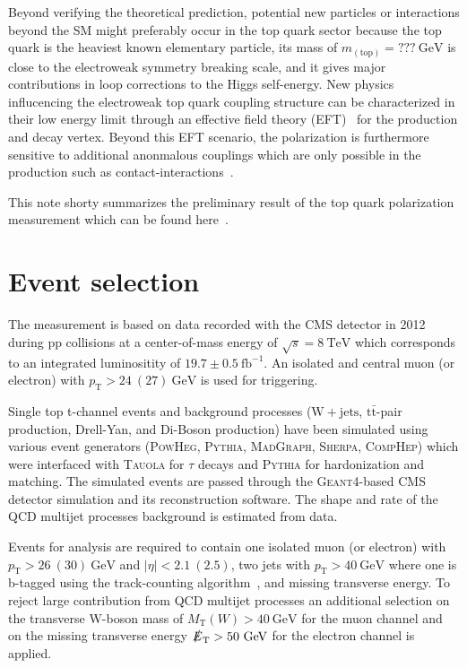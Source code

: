 \documentclass[a4paper]{jpconf}
\newcommand{\unit}[1]{\ensuremath{\mathrm{~#1}}}
\newcommand{\wjets}[0]{\mathrm{W+jets}}
\newcommand{\ttbar}[0]{\ensuremath{\mathrm{t\bar{t}}}}
\newcommand{\pT}[0]{\ensuremath{p_\mathrm{T}}}
\newcommand{\mtw}[0]{\ensuremath{M_\mathrm{T}(W)}}
\newcommand{\met}[0]{\ensuremath{\slashed E_\mathrm{T}}}
\begin{document}
Beyond verifying the theoretical prediction, potential new particles or interactions beyond the SM might preferably occur in the top quark sector because the top quark is the heaviest known elementary particle, its mass of $m_{\mathrm{(top)}}=???\unit{GeV}$ is close to the electroweak symmetry breaking scale, and it gives major contributions in loop corrections to the Higgs self-energy. New physics influcencing the electroweak top quark coupling structure can be characterized in their low energy limit through an effective field theory (EFT)~\cite{jaaswpol} for the production and decay vertex. Beyond this EFT scenario, the polarization is furthermore sensitive to additional anonmalous couplings which are only possible in the production such as contact-interactions~\cite{fabian}.


This note shorty summarizes the preliminary result of the top quark polarization measurement which can be found here~\cite{stpol}.


\section{Event selection}
The measurement is based on data recorded with the CMS detector in 2012 during pp collisions at a center-of-mass energy of $\sqrt{s}=8\unit{TeV}$ which corresponds to an integrated luminositity of $19.7\pm0.5\unit{fb^{-1}}$. An isolated and central muon (or electron) with $\pT>24~(27)\unit{GeV}$ is used for triggering.


Single top t-channel events and background processes ($\wjets$, $\ttbar$-pair production, Drell-Yan, and Di-Boson production) have been simulated using various event generators (\textsc{PowHeg}, \textsc{Pythia}, \textsc{MadGraph}, \textsc{Sherpa}, \textsc{CompHep}) which were interfaced with \textsc{Tauola} for $\tau$ decays and \textsc{Pythia} for hardonization and matching. The simulated events are passed through the \textsc{Geant4}-based CMS detector simulation and its reconstruction software. The shape and rate of the QCD multijet processes background is estimated from data.


Events for analysis are required to contain one isolated muon (or electron) with $\pT>26~(30)\unit{GeV}$ and $|\eta|<2.1~(2.5)$, two jets with $\pT>40\unit{GeV}$ where one is b-tagged using the track-counting algorithm~\cite{tc}, and missing transverse energy. To reject large contribution from QCD multijet processes an additional selection on the transverse W-boson mass of $\mtw>40\unit{GeV}$ for the muon channel and on the missing transverse energy $\met>50\unit{GeV}$ for the electron channel is applied. 
\end{document}
